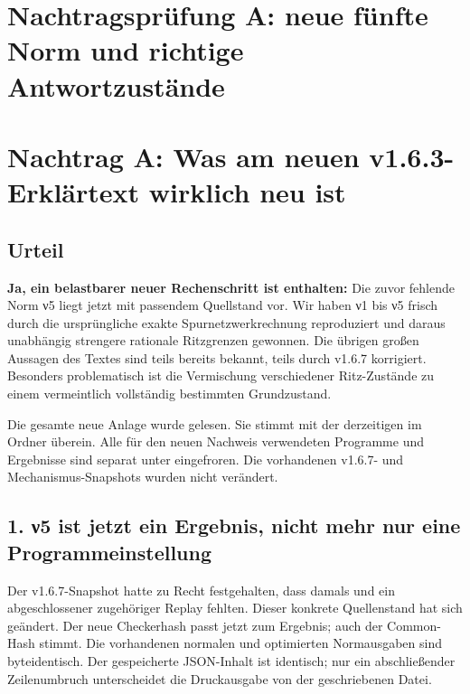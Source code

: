 \section{Nachtragsprüfung A: neue fünfte Norm und richtige
Antwortzustände}\label{nachtragspruxfcfung-a-neue-fuxfcnfte-norm-und-richtige-antwortzustuxe4nde}

\section{Nachtrag A: Was am neuen v1.6.3-Erklärtext wirklich neu
ist}\label{nachtrag-a-was-am-neuen-v1.6.3-erkluxe4rtext-wirklich-neu-ist}

\subsection{Urteil}\label{urteil}

\textbf{Ja, ein belastbarer neuer Rechenschritt ist enthalten:} Die
zuvor fehlende Norm ν5 liegt jetzt mit passendem Quellstand vor. Wir
haben ν1 bis ν5 frisch durch die ursprüngliche exakte
Spurnetzwerkrechnung reproduziert und daraus unabhängig strengere
rationale Ritzgrenzen gewonnen. Die übrigen großen Aussagen des Textes
sind teils bereits bekannt, teils durch v1.6.7 korrigiert. Besonders
problematisch ist die Vermischung verschiedener Ritz-Zustände zu einem
vermeintlich vollständig bestimmten Grundzustand.

Die gesamte neue Anlage wurde gelesen. Sie stimmt mit der derzeitigen
 im Ordner
überein. Alle für den neuen Nachweis verwendeten Programme und
Ergebnisse sind separat unter  eingefroren.
Die vorhandenen v1.6.7- und Mechanismus-Snapshots wurden nicht
verändert.

\subsection{1. ν5 ist jetzt ein Ergebnis, nicht mehr nur eine
Programmeinstellung}\label{ux3bd5-ist-jetzt-ein-ergebnis-nicht-mehr-nur-eine-programmeinstellung}

Der v1.6.7-Snapshot hatte zu Recht festgehalten, dass damals
 und ein abgeschlossener zugehöriger
Replay fehlten. Dieser konkrete Quellenstand hat sich geändert. Der neue
Checkerhash
passt jetzt zum Ergebnis; auch der Common-Hash stimmt. Die vorhandenen
normalen und optimierten Normausgaben sind byteidentisch. Der
gespeicherte JSON-Inhalt ist identisch; nur ein abschließender
Zeilenumbruch unterscheidet die Druckausgabe von der geschriebenen
Datei.

